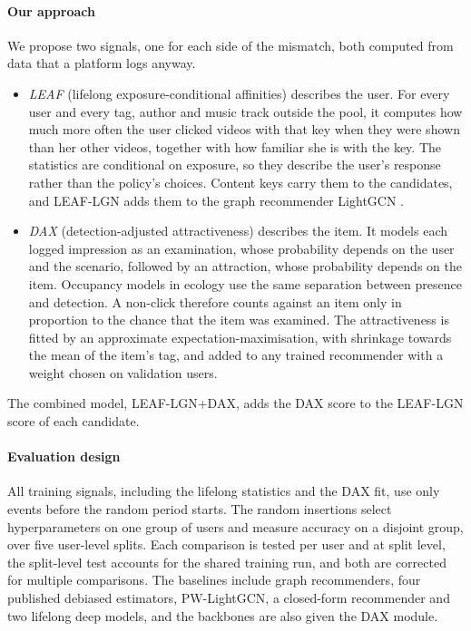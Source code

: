 \documentclass[preprint,12pt,authoryear]{elsarticle}
\begin{document}
\paragraph{Our approach} We propose two signals, one for each side of the mismatch, both computed from data that a platform logs anyway.
\begin{itemize}
\item \emph{LEAF} (lifelong exposure-conditional affinities) describes the user. For every user and every tag, author and music
  track outside the pool, it computes how much more often the user clicked videos with that key when they were shown than her other
  videos, together with how familiar she is with the key. The statistics are conditional on exposure, so they describe the user's
  response rather than the policy's choices. Content keys carry them to the candidates, and LEAF-LGN adds them to the graph
  recommender LightGCN \citep{he2020lightgcn}.
\item \emph{DAX} (detection-adjusted attractiveness) describes the item. It models each logged impression as an examination, whose
  probability depends on the user and the scenario, followed by an attraction, whose probability depends on the item. Occupancy
  models in ecology \citep{mackenzie2002occupancy} use the same separation between presence and detection. A non-click therefore
  counts against an item only in proportion to the chance that the item was examined. The attractiveness is fitted by an
  approximate expectation-maximisation, with shrinkage towards the mean of the item's tag, and added to any trained recommender with a weight
  chosen on validation users.
\end{itemize}
The combined model, LEAF-LGN+DAX, adds the DAX score to the LEAF-LGN score of each candidate.

\paragraph{Evaluation design} All training signals, including the lifelong statistics and the DAX fit, use only events before the
random period starts. The random insertions select hyperparameters on one group of users and measure accuracy on a disjoint group,
over five user-level splits. Each comparison is tested per user and at split level, the split-level test accounts for the shared
training run, and both are corrected for multiple comparisons. The baselines include graph recommenders, four published debiased
estimators, PW-LightGCN, a closed-form recommender and two lifelong deep models, and the backbones are also given the DAX module.
\end{document}
